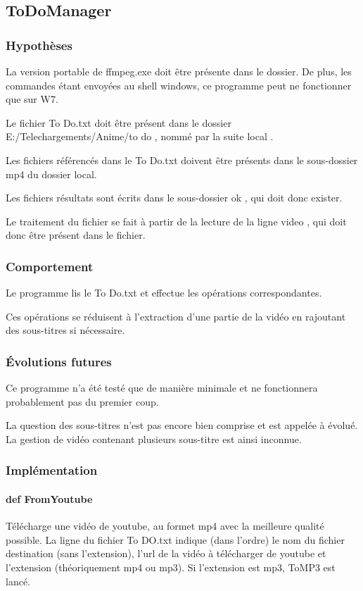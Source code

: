 \documentclass[a4paper,12pt]{article}
\begin{document}
\subsection{ToDoManager}
\subsubsection{Hypothèses}
La version portable de ffmpeg.exe doit être présente dans le dossier. De plus, les commandes étant envoyées au shell windows, ce programme peut ne fonctionner que sur W7.

Le fichier \og To Do.txt \fg{} doit être présent dans le dossier \og E:/Telechargements/Anime/to do \fg, nommé par la suite \og local \fg.

Les fichiers référencés dans le To Do.txt doivent être présents dans le sous-dossier \og mp4 \fg{} du dossier local.

Les fichiers résultats sont écrits dans le sous-dossier \og ok \fg, qui doit donc exister.

Le traitement du fichier se fait à partir de la lecture de la ligne \og video \fg, qui doit donc être présent dans le fichier.
\subsubsection{Comportement}
Le programme lis le To Do.txt et effectue les opérations correspondantes. 

Ces opérations se réduisent à l'extraction d'une partie de la vidéo en rajoutant des sous-titres si nécessaire.
\subsubsection{Évolutions futures}
Ce programme n'a été testé que de manière minimale et ne fonctionnera probablement pas du premier coup. 

La question des sous-titres n'est pas encore bien comprise et est appelée à évolué. La gestion de vidéo contenant plusieurs sous-titre est ainsi inconnue. 
\subsubsection{Implémentation}
\paragraph{def FromYoutube}
Télécharge une vidéo de youtube, au formet mp4 avec la meilleure qualité possible. La ligne du fichier \og To DO.txt \fg{}indique (dans l'ordre) le nom du fichier destination (sans l'extension), l'url de la vidéo à télécharger de youtube et l'extension (théoriquement mp4 ou mp3). Si l'extension est mp3, ToMP3 est lancé. 
\end{document}
